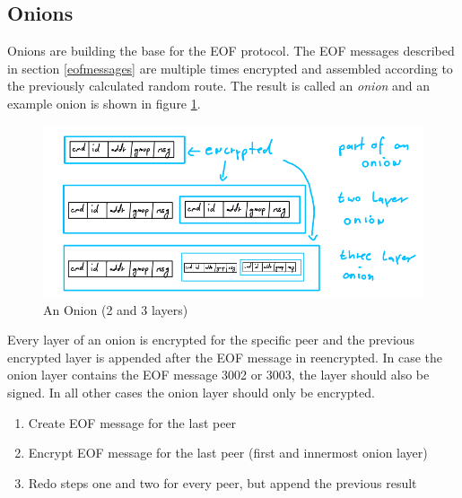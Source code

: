 \subsection{Onions}
\label{eofonion}
Onions are building the base for the EOF protocol.
The EOF messages described in section \ref{eofmessages}
are multiple times encrypted and assembled according to 
the previously calculated random route. 
The result is called an \textit{onion} and
an example onion is shown in figure \ref{onion}.
\begin{figure}
    \centering
    \caption{An Onion (2 and 3 layers)}
    \label{onion}
    \includegraphics[scale=0.8]{onion.png}
\end{figure}
Every layer of an onion is encrypted for the specific peer
and the previous encrypted layer is appended after the EOF message
in reencrypted.
In case the onion layer contains the EOF message
3002 or 3003, the layer should also be signed. In all other
cases the onion layer should only be encrypted.
\begin{enumerate}
\item Create EOF message for the last peer
\item Encrypt EOF message for the last peer (first and innermost onion layer)
\item Redo steps one and two for every peer, but append the previous result
\end{enumerate}
